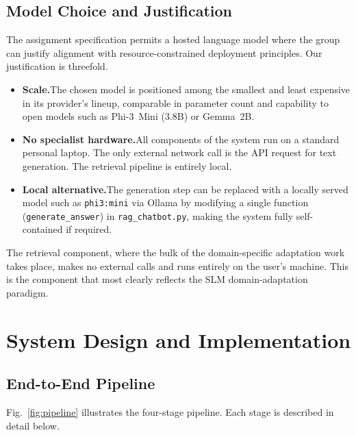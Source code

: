 \documentclass[10pt,conference]{IEEEtran}
\begin{document}
\subsection{Model Choice and Justification}

The assignment specification permits a hosted language model where the
group can justify alignment with resource-constrained deployment
principles. Our justification is threefold.

\begin{itemize}
  \item \textbf{Scale.}\enspace The chosen model is positioned among
        the smallest and least expensive in its provider's lineup,
        comparable in parameter count and capability to open models
        such as Phi-3~Mini (3.8B) or Gemma~2B.
  \item \textbf{No specialist hardware.}\enspace All components of the
        system run on a standard personal laptop. The only external
        network call is the API request for text generation. The
        retrieval pipeline is entirely local.
  \item \textbf{Local alternative.}\enspace The generation step can
        be replaced with a locally served model such as
        \texttt{phi3:mini} via Ollama by modifying a single function
        (\texttt{generate\_answer}) in \texttt{rag\_chatbot.py},
        making the system fully self-contained if required.
\end{itemize}

\noindent The retrieval component, where the bulk of the
domain-specific adaptation work takes place, makes no external calls
and runs entirely on the user's machine. This is the component that
most clearly reflects the SLM domain-adaptation paradigm.

\section{System Design and Implementation}
\label{sec:system}

\subsection{End-to-End Pipeline}

Fig.~\ref{fig:pipeline} illustrates the four-stage pipeline. Each
stage is described in detail below.
\end{document}
